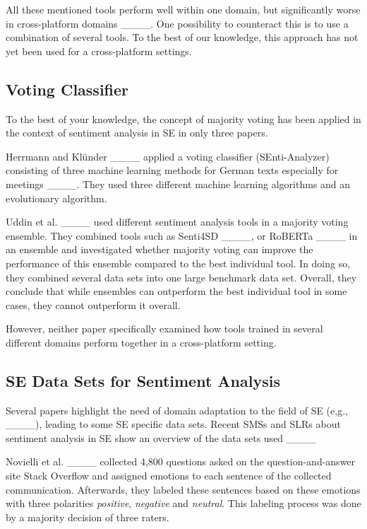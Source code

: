 All these mentioned tools perform well within one domain, but significantly worse in cross-platform domains ____. One possibility to counteract this is to use a combination of several tools. To the best of our knowledge, this approach has not yet been used for a cross-platform settings.

\subsection{Voting Classifier}

To the best of your knowledge, the concept of majority voting has been applied in the context of sentiment analysis in SE in only three papers.

Herrmann and Klünder ____ applied a voting classifier (SEnti-Analyzer) consisting of three machine learning methods for German texts especially for meetings ____. They used three different machine learning algorithms and an evolutionary algorithm.

Uddin et al. ____ used different sentiment analysis tools in a majority voting ensemble. They combined tools such as Senti4SD ____, or RoBERTa ____ in an ensemble and investigated whether majority voting can improve the performance of this ensemble compared to the best individual tool. In doing so, they combined several data sets into one large benchmark data set. Overall, they conclude that while ensembles can outperform the best individual tool in some cases, they cannot outperform it overall. 

However, neither paper specifically examined how tools trained in several different domains perform together in a cross-platform setting.



\subsection{SE Data Sets for Sentiment Analysis}
\label{sec:dataset}

Several papers highlight the need of domain adaptation to the field of SE (e,g., ____), leading to some SE specific data sets. Recent SMSs and SLRs about sentiment analysis in SE show an overview of the data sets used ____

Novielli et al. ____ collected 4,800 questions asked on the question-and-answer site Stack Overflow and assigned emotions to each sentence of the collected communication. Afterwards, they labeled these sentences based on these emotions with three polarities \textit{positive}, \textit{negative} and \textit{neutral}. This labeling process was done by a majority decision of three raters.

